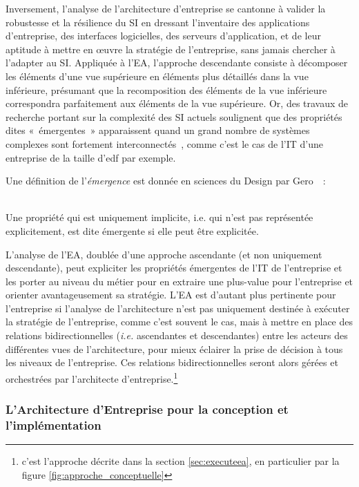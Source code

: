 Inversement, l'analyse de l'architecture d'entreprise se cantonne à valider la
robustesse et la résilience du SI en dressant l'inventaire des applications
d'entreprise, des interfaces logicielles, des serveurs d'application, et de
leur aptitude à mettre en œuvre la stratégie de l'entreprise, sans jamais
chercher à l'adapter au SI. Appliquée à l'EA, l'approche descendante consiste
à décomposer les éléments d'une vue supérieure en éléments plus détaillés dans la
vue inférieure, présumant que la recomposition des éléments de la vue
inférieure correspondra parfaitement aux éléments de la vue supérieure. Or, des
travaux de recherche portant sur la complexité des SI actuels soulignent que
des propriétés dites «~émergentes~» apparaissent quand un grand nombre de
systèmes complexes sont fortement interconnectés~\cite{bullock2004complexity},
comme c'est le cas de l'IT d'une entreprise de la taille d'\gls{edf} par
exemple.

Une définition de l'\textit{émergence} est donnée en sciences du Design par
Gero~\cite{gero1992creativity}~: 
\\\
\begin{definition}
Une propriété qui est uniquement implicite,
i.e.  qui n'est pas représentée explicitement, est dite émergente si elle peut
être explicitée.
\end{definition}

L'analyse de l'EA, doublée d'une approche ascendante (et non
uniquement descendante), peut expliciter les propriétés émergentes de l'IT de
l'entreprise et les porter au niveau du métier pour en extraire une plus-value
pour l'entreprise et orienter avantageusement sa stratégie. L'EA est d'autant
plus pertinente pour l'entreprise si l'analyse de l'architecture n'est pas
uniquement destinée à exécuter la stratégie de l'entreprise, comme c'est
souvent le cas, mais à mettre en place des relations bidirectionnelles
(\textit{i.e.} ascendantes et descendantes) entre les acteurs des différentes
vues de l'architecture, pour mieux éclairer la prise de décision à tous les
niveaux de l'entreprise. Ces relations bidirectionnelles seront alors gérées et
orchestrées par l'architecte d'entreprise.\footnote{c'est l'approche décrite dans la section \ref{sec:executeea}, en particulier par la figure \ref{fig:approche_conceptuelle}}


\subsubsection{L'Architecture d'Entreprise pour la conception et l'implémentation}

